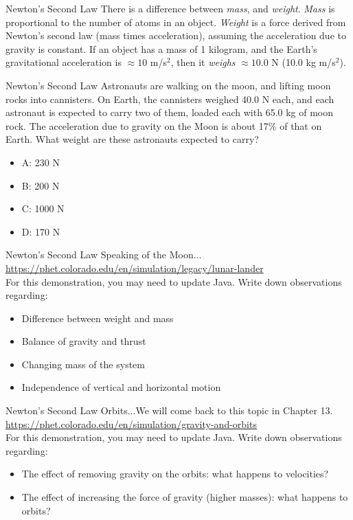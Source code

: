 \documentclass{beamer}
\begin{document}
\begin{frame}{Newton's Second Law}
There is a difference between \alert{\textit{mass}}, and \alert{\textit{weight}}.  \textit{Mass} is proportional to the number of atoms in an object.  \textit{Weight} is a force derived from Newton's second law (mass times acceleration), assuming the acceleration due to gravity is constant.  If an object has a mass of 1 kilogram, and the Earth's gravitational acceleration is $\approx 10$ m/s$^2$, then it \textit{weighs} $\approx 10.0$ N (10.0 kg m/s$^2$).
\end{frame}

\begin{frame}{Newton's Second Law}
Astronauts are walking on the moon, and lifting moon rocks into cannisters.  On Earth, the cannisters weighed 40.0 N each, and each astronaut is expected to carry two of them, loaded each with 65.0 kg of moon rock.  The acceleration due to gravity on the Moon is about 17\% of that on Earth.  What weight are these astronauts expected to carry?
\begin{itemize}
\item A: 230 N
\item B: 200 N
\item C: 1000 N
\item D: 170 N
\end{itemize}
\end{frame}

\begin{frame}{Newton's Second Law}
Speaking of the Moon... \\
\vspace{1cm}
\url{https://phet.colorado.edu/en/simulation/legacy/lunar-lander} \\
\vspace{1cm}
For this demonstration, you may need to update Java.  Write down observations regarding:
\begin{itemize}
\item Difference between weight and mass
\item Balance of gravity and thrust
\item Changing mass of the system
\item Independence of vertical and horizontal motion
\end{itemize}
\end{frame}

\begin{frame}{Newton's Second Law}
Orbits...We will come back to this topic in Chapter 13. \\
\vspace{1 cm}
\url{https://phet.colorado.edu/en/simulation/gravity-and-orbits} \\
\vspace{1 cm}
For this demonstration, you may need to update Java.  Write down observations regarding:
\begin{itemize}
\item The effect of removing gravity on the orbits: what happens to velocities?
\item The effect of increasing the force of gravity (higher masses): what happens to orbits?
\end{itemize}
\end{frame}
\end{document}
